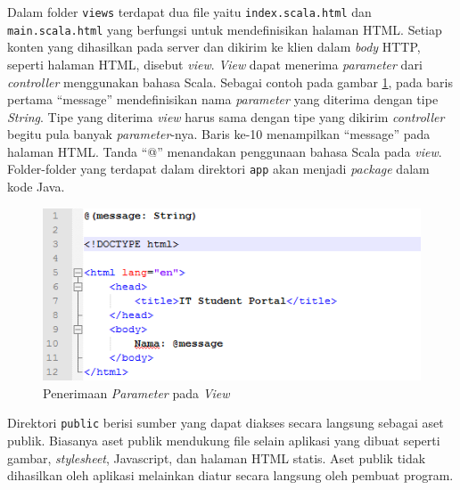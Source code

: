 Dalam folder \texttt{views} terdapat dua file yaitu \texttt{index.scala.html} dan \texttt{main.scala.html} yang berfungsi untuk mendefinisikan halaman HTML. Setiap konten yang dihasilkan pada server dan dikirim ke klien dalam \textit{body} HTTP, seperti halaman HTML, disebut \textit{view}. \textit{View} dapat menerima \textit{parameter} dari \textit{controller} menggunakan bahasa Scala. Sebagai contoh pada gambar \ref{fig:2_exam_view}, pada baris pertama ``message'' mendefinisikan nama \textit{parameter} yang diterima dengan tipe \textit{String}. Tipe yang diterima \textit{view} harus sama dengan tipe yang dikirim \textit{controller} begitu pula banyak \textit{parameter}-nya. Baris ke-10 menampilkan ``message'' pada halaman HTML. Tanda ``@'' menandakan penggunaan bahasa Scala pada \textit{view}. Folder-folder yang terdapat dalam direktori \texttt{app} akan menjadi \textit{package} dalam kode Java.

\begin{figure}[H]
	\centering
	\includegraphics[scale=0.75]{Gambar/example-view}
	\caption{Penerimaan \textit{Parameter} pada \textit{View}} 
	\label{fig:2_exam_view}
\end{figure}

Direktori \texttt{public} berisi sumber yang dapat diakses secara langsung sebagai aset publik. Biasanya aset publik mendukung file selain aplikasi yang dibuat seperti gambar, \textit{stylesheet}, Javascript, dan halaman HTML statis. Aset publik tidak dihasilkan oleh aplikasi melainkan diatur secara langsung oleh pembuat program.

